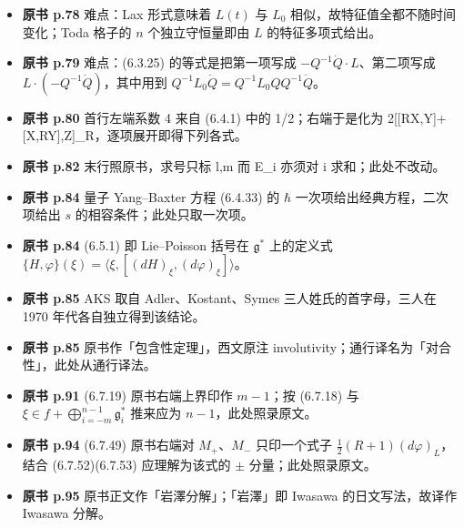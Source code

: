 \begin{itemize}[leftmargin=2.4em,itemsep=4pt,label={\textbullet}]
\item \textbf{原书 p.78} 难点：Lax 形式意味着 $L(t)$ 与 $L_0$ 相似，故特征值全都不随时间变化；Toda 格子的 $n$ 个独立守恒量即由 $L$ 的特征多项式给出。
\item \textbf{原书 p.79} 难点：(6.3.25) 的等式是把第一项写成 $-Q^{-1}\dot{Q}\cdot L$、第二项写成 $L\cdot(-Q^{-1}\dot{Q})$，其中用到 $Q^{-1}L_0\dot{Q}=Q^{-1}L_0QQ^{-1}\dot{Q}$。
\item \textbf{原书 p.80} 首行左端系数 4 来自 (6.4.1) 中的 1/2；右端于是化为 2[[RX,Y]+[X,RY],Z]\_R，逐项展开即得下列各式。
\item \textbf{原书 p.82} 末行照原书，求号只标 l,m 而 E\_i 亦须对 i 求和；此处不改动。
\item \textbf{原书 p.84} 量子 Yang--Baxter 方程 (6.4.33) 的 $\hbar$ 一次项给出经典方程，二次项给出 $s$ 的相容条件；此处只取一次项。
\item \textbf{原书 p.84} (6.5.1) 即 Lie--Poisson 括号在 $\mathfrak{g}^*$ 上的定义式 $\{H,\varphi\}(\xi)=\langle\xi,[(dH)_\xi,(d\varphi)_\xi]\rangle$。
\item \textbf{原书 p.85} AKS 取自 Adler、Kostant、Symes 三人姓氏的首字母，三人在 1970 年代各自独立得到该结论。
\item \textbf{原书 p.85} 原书作「包含性定理」，西文原注 involutivity；通行译名为「对合性」，此处从通行译法。
\item \textbf{原书 p.91} (6.7.19) 原书右端上界印作 $m-1$；按 (6.7.18) 与 $\xi\in f+\bigoplus_{i=-m}^{n-1}\mathfrak{g}^*_i$ 推来应为 $n-1$，此处照录原文。
\item \textbf{原书 p.94} (6.7.49) 原书右端对 $M_+$、$M_-$ 只印一个式子 $\frac{1}{2}(R+1)(d\varphi)_L$，结合 (6.7.52)(6.7.53) 应理解为该式的 $\pm$ 分量；此处照录原文。
\item \textbf{原书 p.95} 原书正文作「岩澤分解」；「岩澤」即 Iwasawa 的日文写法，故译作 Iwasawa 分解。
\end{itemize}

